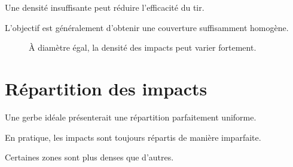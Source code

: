 Une densité insuffisante peut réduire l'efficacité du tir.

L'objectif est généralement d'obtenir une couverture suffisamment homogène.

\begin{figure}[htbp]
\centering


\caption{À diamètre égal, la densité des impacts peut varier fortement.}
\label{fig:densite_gerbe}

\end{figure}

\section{Répartition des impacts}

Une gerbe idéale présenterait une répartition parfaitement uniforme.

En pratique, les impacts sont toujours répartis de manière imparfaite.

Certaines zones sont plus denses que d'autres.

